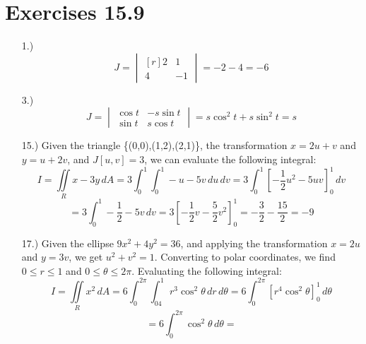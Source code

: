 \documentclass[12pt]{article}
\newcommand{\bracks}[1]{\left[#1\right]}
\begin{document}
\section*{Exercises 15.9}
\begin{itemize}
    \item [1.)] \[J=\begin{vmatrix*}[r]
        2 & 1 \\
        4 & -1
    \end{vmatrix*}=-2-4=-6\]

    \item [3.)] \[J=\begin{vmatrix}
        \cos t & -s\sin t \\
        \sin t & s\cos t
    \end{vmatrix}=s\cos^2t+s\sin^2t=s\]

    \item [15.)] Given the triangle \{(0,0),(1,2),(2,1)\}, the transformation $x=2u+v$ and $y=u+2v$, and $J[u,v]=3$, we can evaluate the following integral:
    \[I=\iint\limits_{R}x-3y\,dA=3\int^1_0\int^1_0-u-5v\,du\,dv=3\int^1_0\bracks{-\frac{1}{2}u^2-5uv}^1_0\,dv\]
    \[=3\int^1_0-\frac{1}{2}-5v\,dv=3\bracks{-\frac{1}{2}v-\frac{5}{2}v^2}^1_0=-\frac{3}{2}-\frac{15}{2}=-9\]

    \item [17.)] Given the ellipse $9x^2+4y^2=36$, and applying the transformation $x=2u$ and $y=3v$, we get $u^2+v^2=1$. Converting to polar coordinates, we find $0\leq r\leq 1$ and $0\leq\theta\leq2\pi$. Evaluating the following integral:
    \[I=\iint\limits_{R}x^2\,dA=6\int^{2\pi}_0\int^1_04r^3\cos^2\theta\,dr\,d\theta=6\int^{2\pi}_0\bracks{r^4\cos^2\theta}^1_0\,d\theta\]
    \[=6\int^{2\pi}_0\cos^2\theta\,d\theta=\]

\end{itemize}
\end{document}
